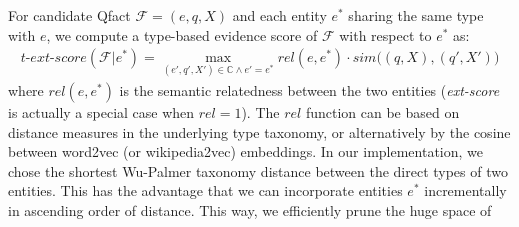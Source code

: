 \vspace{0.1cm}
%
For candidate Qfact $\mathcal{F} = (e,q,X)$ and each entity $e^*$ sharing the same type with $e$, we compute a type-based evidence score of $\mathcal{F}$ with respect to $e^*$ as: 
\begin{align*}
    \textit{t-ext-score}(\mathcal{F}|e^*)= \max\limits_{(e',q',X') \in \mathbb{C} \wedge e'=e^*} \textit{rel}(e, e^*) \cdot \textit{sim}\big((q,X),  (q',X')\big)
\end{align*}
\noindent where $\textit{rel}(e,e^*)$ is the semantic relatedness between the two entities (\textit{ext-score} is actually a special case when $\textit{rel} = 1$). 
The $\textit{rel}$ function can be based on distance measures
in the underlying type taxonomy, or alternatively by the cosine
between word2vec (or wikipedia2vec) embeddings.
In our implementation, we chose the shortest Wu-Palmer 
taxonomy distance \cite{DBLP:conf/acl/WuP94} between the direct types
of two entities. This has
the advantage that we can incorporate entities $e^*$
incrementally in ascending order of distance.
This way, we efficiently prune the huge space of
